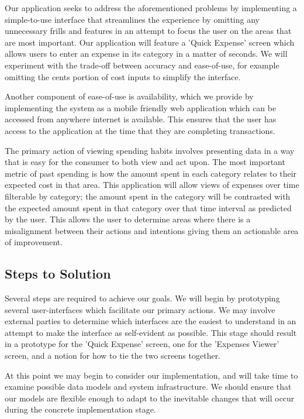 \documentclass{chi2011}
\begin{document}
Our application seeks to address the aforementioned problems by implementing a
simple-to-use interface that streamlines the experience by omitting any
unnecessary frills and features in an attempt to focus the user on the areas
that are most important. Our application will feature a 'Quick Expense' screen
which allows users to enter an expense in its category in a matter of seconds.
We will experiment with the trade-off between accuracy and ease-of-use, for
example omitting the cents portion of cost inputs to simplify the interface.

Another component of ease-of-use is availability, which
we provide by implementing the system as a mobile friendly web application which
can be accessed from anywhere internet is available. This ensures that the user 
has access to the application at the time that they are completing transactions.

The primary action of viewing spending habits involves presenting data in a way
that is easy for the consumer to both view and act upon. The most important
metric of past spending is how the amount spent in each category relates to
their expected cost in that area. This application will allow views of expenses
over time filterable by category; the amount spent in the category will be
contrasted with the expected amount spent in that category over that time
interval as predicted by the user. This allows the user to determine areas where
there is a misalignment between their actions and intentions giving them an
actionable area of improvement.

\subsection{Steps to Solution}

Several steps are required to achieve our goals.  We will begin by prototyping
several user-interfaces which facilitate our primary actions. We may involve
external parties to determine which interfaces are the easiest to understand in
an attempt to make the interface as self-evident as possible. This stage should
result in a prototype for the 'Quick Expense' screen, one for the 'Expenses
Viewer' screen, and a notion for how to tie the two screens together.

At this point we may begin to consider our implementation, and will take time
to examine possible data models and system infrastructure. We should ensure
that our models are flexible enough to adapt to the inevitable changes that will
occur during the concrete implementation stage.
\end{document}
